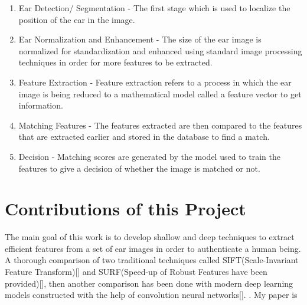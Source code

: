 \begin{enumerate}
\item Ear Detection/ Segmentation - The first stage which is used to localize the position of the ear in the image.
\item Ear Normalization and Enhancement - The size of the ear image is normalized for standardization and enhanced using standard image processing techniques in order for more features to be extracted.
\item Feature Extraction - Feature extraction refers to a process in which the ear image is being reduced to a mathematical model called a feature vector to get information.
\item Matching Features - The features extracted are then compared to the features that are extracted earlier and stored in the database to find a match.
\item Decision - Matching scores are generated by the model used to train the features to give a decision of whether the image is matched or not.
\end{enumerate}

\section{Contributions of this Project} The main goal of this work is to develop
shallow and deep techniques to extract efficient features from a set of ear images in order to authenticate a human being. A thorough comparison of two traditional techniques called SIFT(Scale-Invariant Feature Transform)[] and SURF(Speed-up of Robust Features have been provided)[], then another comparison has been done with modern deep learning models constructed with the help of convolution neural networks[].  \cite{harris}. My paper is \cite{sarkar}
